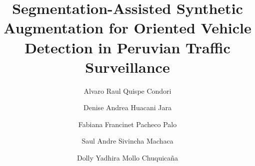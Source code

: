 \begin{frontmatter}






\title{Segmentation-Assisted Synthetic Augmentation for Oriented Vehicle Detection in Peruvian Traffic Surveillance}


\author[First]{Alvaro Raul Quispe Condori}

\author[First]{Denise Andrea Huacani Jara}

\author[First]{Fabiana Francinet Pacheco Palo}

\author[First]{Saul Andre Sivincha Machaca}

\author[First]{Dolly Yadhira Mollo Chuquica\~na}



\address[First]{Universidad Nacional de San Agust{\'i}n, Arequipa, Per{\'u}.}


\end{frontmatter}
